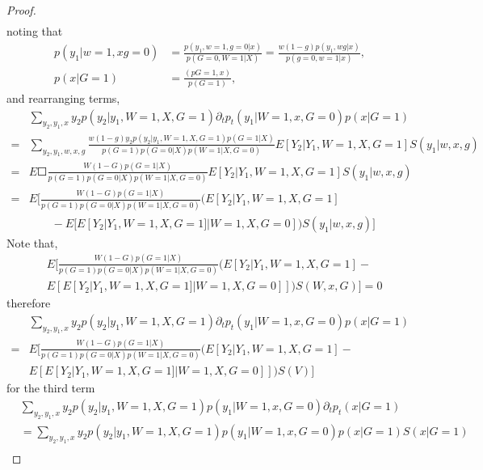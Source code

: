 \documentclass{article}
\begin{document}
\begin{proof}
\begin{align*}
\end{align*} 
noting that
\begin{align*}
p ( y_1 | w = 1, x g = 0 ) &= \frac{ p ( y _1 , w = 1, g  = 0 |x) } { p ( G =0, W =1 | X) } = \frac{ w ( 1 -g) p( y_1 , w g | x) }{ p  (g =0, w =1 | x) } , \\
p ( x | G= 1) &= \frac{ (p  G =1, x ) } { p(G =1 ) },
\end{align*}
and rearranging terms,
\begin{align*}
&\sum_ { y_2 ,y_1,x} y_2  p ( y_2| y_1 , W= 1, X , G= 1)\partial_t p_t ( y_1 | W =1 , x, G= 0 ) p( x | G =1 ) \\ 
= &\sum_ { y_2 ,y_1,w,x, g} \frac{ w ( 1 -g ) y_2   p ( y_2| y_1 , W= 1, X , G= 1) p(G =1 | X) }{ p(G=1) p ( G= 0 | X)  p ( W = 1 | X ,G =0) } E [ Y_2 |   Y_1 ,W = 1,X, G =1 ]   S( y_1  | w , x, g )  \\
= &E \Square{   \frac{ W ( 1 -G)   p(G =1 | X) }{ p(G=1) p ( G= 0 | X)  p ( W = 1 | X ,G =0) } E [ Y_2 |   Y_1 ,W = 1, X, G =1 ]   S( y_1  | w , x, g )}\\
= &E \biggl[  \frac{  W ( 1 -G)   p(G =1 | X) }{ p(G=1) p ( G= 0 | X)  p ( W = 1 | X ,G =0) } (E [ Y_2 |   Y_1 ,W = 1, X, G =1] \\
&\qquad -E [ E[ Y_2 | Y_1 , W =1 , X, G =1 ] | W=1, X, G= 0 ] )  S( y_1  | w , x, g ) \biggr]
\end{align*}
Note that,
\begin{align*}
&E \biggl[  \frac{  W ( 1 -G)   p(G =1 | X) }{ p(G=1) p ( G= 0 | X)  p ( W = 1 | X ,G =0) } (E [ Y_2 |   Y_1 ,W = 1, X, G =1 ] - \\
&E [ E[ Y_2 | Y_1 , W =1 , X, G =1 ] | W=1, X, G= 0 ]] )  S(  W , x, G ) \biggr] = 0
\end{align*}
therefore
\begin{align*}
&\sum_ { y_2 ,y_1,x} y_2  p ( y_2| y_1 , W= 1, X , G= 1)\partial_t p_t ( y_1 | W =1 , x, G= 0 ) p( x | G =1 ) \\ 
= &E \biggl[  \frac{  W ( 1 -G)   p(G =1 | X) }{ p(G=1) p ( G= 0 | X)  p ( W = 1 | X ,G =0) } (E [ Y_2 |   Y_1 ,W = 1, X, G =1 ] -\\
&E [ E[ Y_2 | Y_1 , W =1 , X, G =1 ] | W=1, X, G= 0 ]] )  S(  V) \biggr] 
\end{align*}
for the third term
\begin{align*}
&\sum_ { y_2 ,y_1,x} y_2  p ( y_2| y_1 , W= 1, X , G= 1) p ( y_1 | W =1 , x, G= 0 ) \partial_t p_t( x | G =1 )\\
&= \sum_ { y_2 ,y_1,x} y_2  p ( y_2| y_1 , W= 1, X , G= 1) p ( y_1 | W =1 , x, G= 0 ) p( x | G =1 ) S( x | G= 1) \\

\end{align*}
\end{proof}
\end{document}
